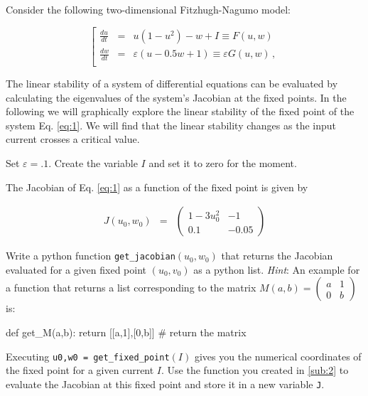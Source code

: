 \documentclass[12pt]{article}
\begin{document}
\begin{Exercise}[title=Graphical bifurcation analysis]

Consider the following two-dimensional Fitzhugh-Nagumo model:

\begin{equation}
\label{eq:1}
\left[\begin{array}{ccll}
{\displaystyle \frac{du}{dt}} &=& u\left(1-u^{2}\right)-w+I \equiv F(u,w)\\[.2cm]
{\displaystyle \frac{dw}{dt}} &=& \varepsilon \left(u -0.5w+1\right) \equiv \varepsilon G(u,w)\, ,\\
\end{array}\right.
\end{equation}

The linear stability of a system of differential equations can be evaluated by calculating the eigenvalues of the system's Jacobian at the fixed points. In the following we will graphically explore the linear stability of the fixed point of the system Eq. \ref{eq:1}. We will find that the linear stability changes as the input current crosses a critical value. 

Set $\varepsilon=.1$. Create the variable $I$ and set it to zero for the moment. 

\Question[title=Jacobian function \& eigenvalues]\label{sub:2}
The Jacobian of Eq. \ref{eq:1} as a function of the fixed point is given by

\begin{eqnarray*}
J\left(u_{0},w_{0}\right) & = & \left.\left(\begin{array}{cc}
1-3u_0^2 & -1\\[5pt]
0.1 & -0.05
\end{array}\right)\right.
\end{eqnarray*}

\subQuestion Write a python function \verb|get_jacobian|$(u_0,w_0)$ that returns the Jacobian evaluated for a given fixed point $(u_0,v_0)$ as a python list. \emph{Hint}: An example for a function that returns a list corresponding to the matrix $M(a,b)=\left(\begin{array}{cc}
a & 1\\
0 & b
\end{array}\right)$ is:
\begin{code}
def get_M(a,b):	
	return [[a,1],[0,b]] # return the matrix
\end{code}

\subQuestion \label{sub:3}
Executing \verb|u0,w0 = get_fixed_point|$(I)$ gives you the numerical coordinates of the fixed point for a given current $I$. Use the function you created in \ref{sub:2} to evaluate the Jacobian at this fixed point and store it in a new variable \verb|J|.


\end{Exercise}
\end{document}
